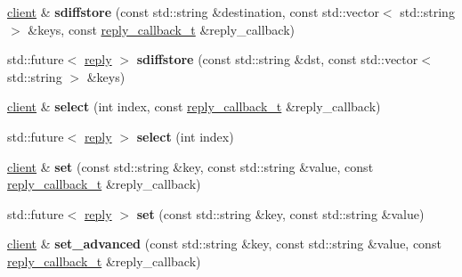 \begin{DoxyCompactItemize}
\hyperlink{classcpp__redis_1_1client}{client} \& {\bfseries sdiffstore} (const std\+::string \&destination, const std\+::vector$<$ std\+::string $>$ \&keys, const \hyperlink{classcpp__redis_1_1client_a061a1140d36d2eaeda82b09a0bb3f9f2}{reply\+\_\+callback\+\_\+t} \&reply\+\_\+callback)
\item 
\mbox{\label{classcpp__redis_1_1client_afd4930fd767bbf14bae1f5ddfd8ee212}} 
std\+::future$<$ \hyperlink{classcpp__redis_1_1reply}{reply} $>$ {\bfseries sdiffstore} (const std\+::string \&dst, const std\+::vector$<$ std\+::string $>$ \&keys)
\item 
\mbox{\label{classcpp__redis_1_1client_aee37b9bd265b8db614b4d7dcfdbaa422}} 
\hyperlink{classcpp__redis_1_1client}{client} \& {\bfseries select} (int index, const \hyperlink{classcpp__redis_1_1client_a061a1140d36d2eaeda82b09a0bb3f9f2}{reply\+\_\+callback\+\_\+t} \&reply\+\_\+callback)
\item 
\mbox{\label{classcpp__redis_1_1client_a5eae97b05129d0571c3b871e1a786434}} 
std\+::future$<$ \hyperlink{classcpp__redis_1_1reply}{reply} $>$ {\bfseries select} (int index)
\item 
\mbox{\label{classcpp__redis_1_1client_a6d654139ca804e9ee2ac0d0683878ece}} 
\hyperlink{classcpp__redis_1_1client}{client} \& {\bfseries set} (const std\+::string \&key, const std\+::string \&value, const \hyperlink{classcpp__redis_1_1client_a061a1140d36d2eaeda82b09a0bb3f9f2}{reply\+\_\+callback\+\_\+t} \&reply\+\_\+callback)
\item 
\mbox{\label{classcpp__redis_1_1client_a734ba95a7e2083fe6bc2e209f94ccab6}} 
std\+::future$<$ \hyperlink{classcpp__redis_1_1reply}{reply} $>$ {\bfseries set} (const std\+::string \&key, const std\+::string \&value)
\item 
\mbox{\label{classcpp__redis_1_1client_aac03b242d1a0948a9eb3567624e72622}} 
\hyperlink{classcpp__redis_1_1client}{client} \& {\bfseries set\+\_\+advanced} (const std\+::string \&key, const std\+::string \&value, const \hyperlink{classcpp__redis_1_1client_a061a1140d36d2eaeda82b09a0bb3f9f2}{reply\+\_\+callback\+\_\+t} \&reply\+\_\+callback)
\item 

\end{DoxyCompactItemize}
